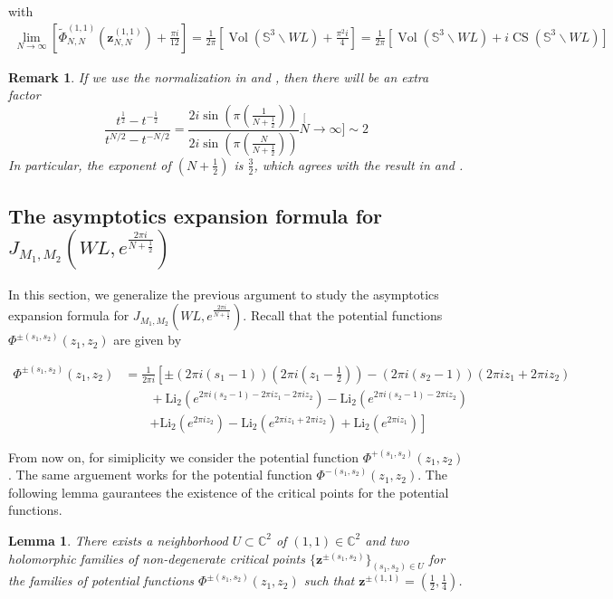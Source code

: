 \documentclass[10pt,a4paper]{article}
\newcommand{\lt}{\left}
\newcommand{\rt}{\right}
\def\Vol{\operatorname{Vol}}
\def \CC{\mathbb C}
\newtheorem{lemma}{Lemma}
\newtheorem{remark}{Remark}
\def\SS{{\mathbb S}}
\def\CC{{\mathbb C}}
\def\Vol{\operatorname{Vol}}
\def\CS{\operatorname{CS}}
\def \Li{\operatorname{Li_2}}
\begin{document}
with
\begin{align}
\lim_{N\to \infty}
\lt[ \tilde\Phi^{(1,1)}_{N,N} (\mathbf{z}^{(1,1)}_{N,N}) + \frac{\pi i}{12} \rt]
= \frac{1}{2\pi}\lt[ \Vol(\SS^3\backslash WL) + \frac{\pi^2 i }{4} \rt]
= \frac{1}{2\pi}[\Vol(\SS^3\backslash WL)+ i \CS(\SS^3\backslash WL)]
\end{align}

\begin{remark}
If we use the normalization in \cite{HZ07} and \cite{V08}, then there will be an extra factor
$$ \frac{t^{\frac{1}{2}}-t^{-\frac{1}{2}}}{t^{N/2}-t^{-N/2}} = \frac{2i\sin\lt(\pi (\frac{1}{N+\frac{1}{2}}) \rt)}{2i\sin\lt(\pi (\frac{N}{N+\frac{1}{2}}) \rt)} \stackrel[N \to \infty]{\sim}{} 2 $$
In particular, the exponent of $(N+\frac{1}{2})$ is $\frac{3}{2}$, which agrees with the result in \cite{HZ07} and \cite{V08}.
\end{remark}

\subsection{The asymptotics expansion formula for $J_{M_1,M_2}(WL,e^{\frac{2\pi i}{N+\frac{1}{2}}})$}\label{WLs}
In this section, we generalize the previous argument to study the asymptotics expansion formula for $J_{M_1,M_2}(WL,e^{\frac{2\pi i}{N+\frac{1}{2}}})$. Recall that the potential functions $\Phi^{\pm(s_1, s_2)} (z_1,z_2)$ are given by

\begin{align*}
\Phi^{\pm(s_1, s_2)} (z_1,z_2) 
&=  \frac{1}{2\pi i} \lt[ \pm \lt(2\pi i \lt( s_1 - 1\rt)\rt) \lt(2\pi i \lt(z_1 -\frac{1}{2} \rt)\rt)  - (2\pi i (s_2-1))(2\pi i z_1 + 2\pi i z_2)  \rt. \\
&\qquad + \Li\lt(e^{2\pi i (s_2-1) - 2\pi i z_1 - 2\pi i z_2}\rt) - \Li\lt( e^{2\pi i (s_2-1) - 2\pi i z_2 }\rt) \\
&\qquad \lt.+ \Li \lt(e^{2\pi i z_2}\rt) - \Li\lt(e^{2\pi iz_1+ 2\pi i z_2}\rt) + \Li\lt(e^{2\pi i z_1}\rt)  \rt]
\end{align*}


From now on, for simiplicity we consider the potential function $\Phi^{+(s_1,s_2)}(z_1,z_2)$. The same arguement works for the potential function $\Phi^{-(s_1,s_2)}(z_1,z_2)$. The following lemma gaurantees the existence of the critical points for the potential functions.
\begin{lemma} There exists a neighborhood $U\subset \CC^2$ of $(1,1) \in \CC^2$ and two holomorphic families of non-degenerate critical points $\{\mathbf{z}^{\pm(s_1,s_2)} \}_{(s_1,s_2) \in U}$ for the families of potential functions $\Phi^{\pm(s_1,s_2)}(z_1,z_2)$ such that $\mathbf{z}^{\pm(1,1)} = \lt(\frac{1}{2}, \frac{1}{4} \rt)$. 
\end{lemma}
\end{document}
